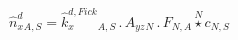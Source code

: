\documentclass[border=2pt]{standalone}
\begin{document}
${{\hat{n}^{d}_x}}{_{A, S}}={{\hat{k}^{d,Fick}_x}}{_{A, S}} \, . \, {{A_{yz}}}{_{N}} \, . \, {{F}}{_{N, A}} \stackrel{N}{\star} {c}{_{N, S}}$
\end{document}
